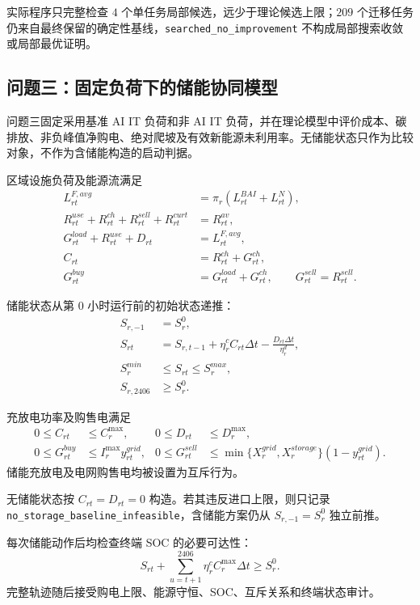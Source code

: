\documentclass[withoutpreface,bwprint]{cumcmthesis}
\begin{document}
实际程序只完整检查 $4$ 个单任务局部候选，远少于理论候选上限；$209$ 个迁移任务仍来自最终保留的确定性基线，\texttt{searched\_no\_improvement} 不构成局部搜索收敛或局部最优证明。

\subsection{问题三：固定负荷下的储能协同模型}

问题三固定采用基准 AI IT 负荷和非 AI IT 负荷，并在理论模型中评价成本、碳排放、非负峰值净购电、绝对爬坡及有效新能源未利用率。无储能状态只作为比较对象，不作为含储能构造的启动判据。

区域设施负荷及能源流满足
\begin{align}
L_{rt}^{F,avg}&=\pi_r(L_{rt}^{BAI}+L_{rt}^{N}),\\
R_{rt}^{use}+R_{rt}^{ch}+R_{rt}^{sell}+R_{rt}^{curt}&=R_{rt}^{av},\\
G_{rt}^{load}+R_{rt}^{use}+D_{rt}&=L_{rt}^{F,avg},\\
C_{rt}&=R_{rt}^{ch}+G_{rt}^{ch},\\
G_{rt}^{buy}&=G_{rt}^{load}+G_{rt}^{ch},\qquad
G_{rt}^{sell}=R_{rt}^{sell}.
\end{align}

储能状态从第 $0$ 小时运行前的初始状态递推：
\begin{align}
S_{r,-1}&=S_r^0,\\
S_{rt}&=S_{r,t-1}+\eta_r^cC_{rt}\Delta t
-\frac{D_{rt}\Delta t}{\eta_r^d},\\
S_r^{min}&\le S_{rt}\le S_r^{max},\\
S_{r,2406}&\ge S_r^0.
\end{align}

充放电功率及购售电满足
\begin{align}
0\le C_{rt}&\le C_r^{\max},&
0\le D_{rt}&\le D_r^{\max},\\
0\le G_{rt}^{buy}&\le I_r^{\max}y_{rt}^{grid},&
0\le G_{rt}^{sell}
&\le\min\{X_r^{grid},X_r^{storage}\}(1-y_{rt}^{grid}).
\end{align}
储能充放电及电网购售电均被设置为互斥行为。

无储能状态按 $C_{rt}=D_{rt}=0$ 构造。若其违反进口上限，则只记录 \texttt{no\_storage\_\allowbreak baseline\_\allowbreak infeasible}，含储能方案仍从 $S_{r,-1}=S_r^0$ 独立前推。

每次储能动作后均检查终端 SOC 的必要可达性：
\begin{equation}
S_{rt}+\sum_{u=t+1}^{2406}\eta_r^cC_r^{\max}\Delta t\ge S_r^0.
\end{equation}
完整轨迹随后接受购电上限、能源守恒、SOC、互斥关系和终端状态审计。
\end{document}
